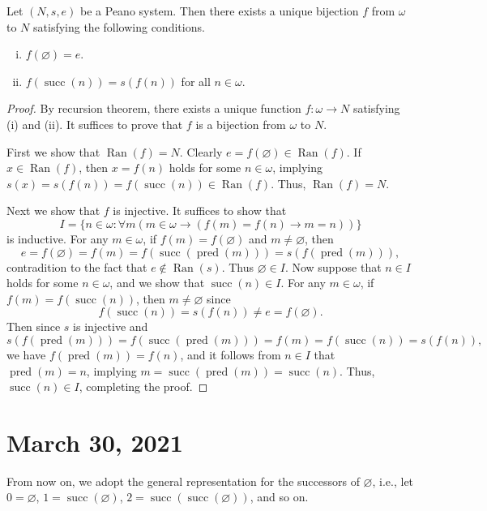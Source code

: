 \documentclass[11pt]{article}
\DeclareMathOperator{\ran}{Ran}
\DeclareMathOperator{\suc}{succ}
\DeclareMathOperator{\prd}{pred}
\begin{document}
\begin{corollary}
  \label{thm:peano-isomorphism}
  Let $(N, s, e)$ be a Peano system.
  Then there exists a unique bijection $f$ from $\omega$ to $N$ satisfying the following conditions.
  \begin{enumerate}[(i)]
    \item $f(\varnothing) = e$.
    \item $f(\suc(n)) = s(f(n))$ for all $n \in \omega$.
  \end{enumerate}
\end{corollary}
\begin{proof}
  By recursion theorem, there exists a unique function $f: \omega \to N$ satisfying (i) and (ii).
  It suffices to prove that $f$ is a bijection from $\omega$ to $N$.
  \par First we show that $\ran(f) = N$.
  Clearly $e = f(\varnothing) \in \ran(f)$.
  If $x \in \ran(f)$, then $x = f(n)$ holds for some $n \in \omega$, implying $s(x) = s(f(n)) = f(\suc(n)) \in \ran(f)$.
  Thus, $\ran(f) = N$.
  \par Next we show that $f$ is injective.
  It suffices to show that
  \begin{equation*}
    I = \{n \in \omega: \forall m (m \in \omega \to (f(m) = f(n) \to m = n))\}
  \end{equation*}
  is inductive.
  For any $m \in \omega$, if $f(m) = f(\varnothing)$ and $m \neq \varnothing$, then
  \begin{equation*}
    e = f(\varnothing) = f(m) = f(\suc(\prd(m))) = s(f(\prd(m))),
  \end{equation*}
  contradition to the fact that $e \notin \ran(s)$.
  Thus $\varnothing \in I$.
  Now suppose that $n \in I$ holds for some $n \in \omega$, and we show that $\suc(n) \in I$.
  For any $m \in \omega$, if $f(m) = f(\suc(n))$, then $m \neq \varnothing$ since
  \begin{equation*}
    f(\suc(n)) = s(f(n)) \neq e = f(\varnothing).
  \end{equation*}
  Then since $s$ is injective and
  \begin{equation*}
    s(f(\prd(m))) = f(\suc(\prd(m))) = f(m) = f(\suc(n)) = s(f(n)),
  \end{equation*}
  we have $f(\prd(m)) = f(n)$, and it follows from $n \in I$ that $\prd(m) = n$, implying $m = \suc(\prd(m)) = \suc(n)$.
  Thus, $\suc(n) \in I$, completing the proof.
\end{proof}

\section{March 30, 2021}
From now on, we adopt the general representation for the successors of $\varnothing$, i.e., let $0 = \varnothing$, $1 = \suc(\varnothing)$, $2 = \suc(\suc(\varnothing))$, and so on.
\end{document}

